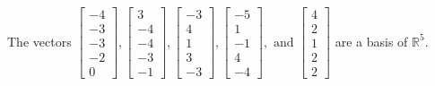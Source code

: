 \begin{exercise}
\begin{exerciseStatement}
  \end{exerciseStatement}
  \begin{exerciseAnswer}
   The vectors \(\left[\begin{array}{r}
-4 \\
-3 \\
-3 \\
-2 \\
0
\end{array}\right] , \left[\begin{array}{r}
3 \\
-4 \\
-4 \\
-3 \\
-1
\end{array}\right] , \left[\begin{array}{r}
-3 \\
4 \\
1 \\
3 \\
-3
\end{array}\right] , \left[\begin{array}{r}
-5 \\
1 \\
-1 \\
4 \\
-4
\end{array}\right] , \text{ and } \left[\begin{array}{r}
4 \\
2 \\
1 \\
2 \\
2
\end{array}\right]\) 
  	 are  a basis of \(\mathbb{R}^5\).
  


  \end{exerciseAnswer}
\end{exercise}